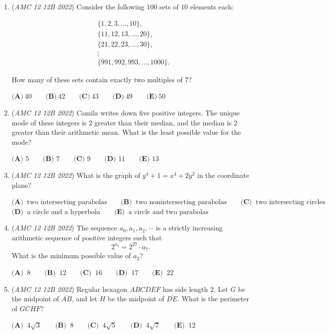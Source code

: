 \begin{enumerate}
	\item (\textit{AMC 12 12B 2022}) Consider the following $100$ sets of $10$ elements each:

 \begin{align*} &\{1,2,3,\ldots,10\}, \\ &\{11,12,13,\ldots,20\},\\ &\{21,22,23,\ldots,30\},\\ &\vdots\\ &\{991,992,993,\ldots,1000\}. \end{align*}

How many of these sets contain exactly two multiples of $7$?


 $\textbf{(A)}\ 40\qquad\textbf{(B)}\ 42\qquad\textbf{(C)}\ 43\qquad\textbf{(D)}\ 49\qquad\textbf{(E)}\ 50$


	\item (\textit{AMC 12 12B 2022}) Camila writes down five positive integers. The unique mode of these integers is $2$ greater than their median, and the median is $2$ greater than their arithmetic mean. What is the least possible value for the mode?


 $\textbf{(A) }5\qquad\textbf{(B) }7\qquad\textbf{(C) }9\qquad\textbf{(D) }11\qquad\textbf{(E) }13$


	\item (\textit{AMC 12 12B 2022}) What is the graph of $y^4+1=x^4+2y^2$ in the coordinate plane?


 $\textbf{(A) }\ \text{two intersecting parabolas} \qquad \textbf{(B) }\ \text{two nonintersecting parabolas} \qquad \textbf{(C) }\ \text{two intersecting circles} \qquad$
$\textbf{(D) }\ \text{a circle and a hyperbola} \qquad \textbf{(E) }\ \text{a circle and two parabolas}$


	\item (\textit{AMC 12 12B 2022}) The sequence $a_0,a_1,a_2,\cdots$ is a strictly increasing arithmetic sequence of positive integers such that 
 \[2^{a_7}=2^{27} \cdot a_7.\] What is the minimum possible value of $a_2$?


 $\textbf{(A) }\ 8 \qquad \textbf{(B) }\ 12 \qquad \textbf{(C) }\ 16 \qquad \textbf{(D) }\ 17 \qquad \textbf{(E) }\ 22$


	\item (\textit{AMC 12 12B 2022}) Regular hexagon $ABCDEF$ has side length $2$. Let $G$ be the midpoint of $\overline{AB}$, and let $H$ be the midpoint of $\overline{DE}$. What is the perimeter of $GCHF$?


 $\textbf{(A) }\ 4\sqrt3 \qquad \textbf{(B) }\ 8 \qquad \textbf{(C) }\ 4\sqrt5 \qquad \textbf{(D) }\ 4\sqrt7 \qquad \textbf{(E) }\ 12$



\end{enumerate}
